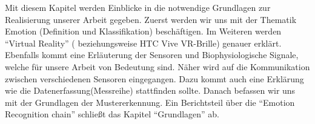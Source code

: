 

Mit diesem Kapitel werden Einblicke in die notwendige Grundlagen zur Realisierung unserer Arbeit gegeben. 
Zuerst werden wir uns mit der Thematik Emotion (Definition und Klassifikation) beschäftigen. 
Im Weiteren werden ``Virtual Reality'' ( beziehungsweise HTC Vive VR-Brille) genauer erklärt. 
Ebenfalls kommt eine Erläuterung der Sensoren und Biophysiologische Signale, welche f{\"u}r unsere Arbeit von Bedeutung sind. 
Näher wird auf die Kommunikation zwischen verschiedenen Sensoren eingegangen.
Dazu kommt auch eine Erklärung wie die Datenerfassung(Messreihe) stattfinden sollte.
Danach befassen wir uns mit der Grundlagen der Mustererkennung. 
Ein Berichtsteil {\"u}ber die ``Emotion Recognition chain'' schlie{\ss}t das Kapitel ``Grundlagen'' ab.













